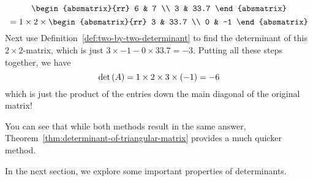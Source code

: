 \begin{solution}
\begin{equation*}
{\begin{absmatrix}{rr}
6 & 7 \\
3 & 33.7
\end{absmatrix} }
\end{equation*}
\begin{equation*}
=1\times 2\times \begin{absmatrix}{rr}
3 & 33.7 \\
0 & -1
\end{absmatrix}
\end{equation*}
Next use Definition~\ref{def:two-by-two-determinant} to find the determinant of this $2 \times 2$-matrix, which is
just $3 \times -1  - 0 \times 33.7 = -3$.
Putting all these steps together, we have 
\begin{equation*}
\det \left(A\right)
=
1\times 2\times 3\times \left(-1\right) =-6
\end{equation*}
which is just the product of the entries down the main diagonal of the
original matrix!
\end{solution}

You can see that while both methods result in the same answer, Theorem~\ref{thm:determinant-of-triangular-matrix} provides
a much quicker method. 

In the next section, we explore some important properties of determinants.